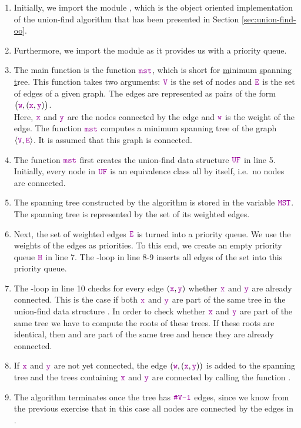 \begin{enumerate}
\item Initially, we import the module , which is the object oriented 
      implementation of the union-find algorithm that has been presented in Section \ref{sec:union-find-oo}.
\item Furthermore, we import the module  as it provides us with a priority queue.
\item The main function is the function $\mytt{mst}$, which is short for \underline{m}inimum
      \underline{s}panning \underline{t}ree.  This function takes two arguments:
      $\mytt{V}$ is the set of nodes and $\mytt{E}$ is the set of edges of a given graph.  The edges are represented as
      pairs of the form
      \\[0.2cm]
      \hspace*{1.3cm}
      $\bigl(\mytt{w}, (\mytt{x}, \mytt{y})\bigr)$.
      \\[0.2cm] 
      Here, $\mytt{x}$ and $\mytt{y}$ are the nodes connected by the edge and $\mytt{w}$ is the
      weight of the edge.  The function $\mytt{mst}$ computes a minimum spanning tree of  the
      graph  $\pair(\mytt{V},\mytt{E})$.  It is assumed that this graph is connected.
\item The function $\mytt{mst}$ first creates the union-find data structure $\mytt{UF}$ in line 5.
      Initially, every node in $\mytt{UF}$ is  an equivalence class all by itself, i.e.~no nodes
      are connected.
\item The spanning tree constructed by the algorithm is stored in the variable $\mytt{MST}$.
      The spanning tree is represented by the set of its weighted edges.  
\item Next, the set of weighted edges $\mytt{E}$ is turned into a priority queue.
      We use the weights of the edges as priorities. 
      To this end, we create an empty priority queue $\mytt{H}$ in line 7.
      The -loop in line 8-9 inserts all edges of the set  into this priority queue.
\item The -loop in line 10 checks for every edge $(\mytt{x},\mytt{y})$  whether $\mytt{x}$ and $\mytt{y}$ are already
      connected.  This is the case if both $\mytt{x}$ and $\mytt{y}$ are part of the same tree
      in the union-find data structure .  In order to
      check whether $\mytt{x}$ and $\mytt{y}$ are part of the same tree
      we have to compute the roots of these trees. 
      If these roots are identical, then  and  are part of the same tree and hence
      they are already connected. 
\item If $\mytt{x}$ and $\mytt{y}$ are not yet connected, the  edge $(\mytt{w}, (\mytt{x}, \mytt{y}))$ is added to the
      spanning tree and the trees containing $\mytt{x}$ and $\mytt{y}$ are connected by calling the function
      .
\item The algorithm terminates once the tree  has $\mytt{\#V-1}$ edges, since we know from the previous
      exercise that in this case all nodes are connected by the edges in .
\end{enumerate}


